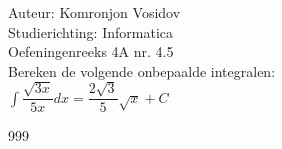 \documentclass[a4paper]{article}
\newcommand{\dint}{\displaystyle\int}
\begin{document}
	
	\noindent \large Auteur: Komronjon Vosidov \\
	\noindent \large Studierichting: Informatica\\
	\noindent \large Oefeningenreeks 4A nr. 4.5\\
	
	
	\medskip
	\normalsize
	Bereken de volgende onbepaalde integralen:\\
	
$ \dint \dfrac{\sqrt{3x}}{5x} dx = \dfrac{2 \sqrt{3}}{5} \sqrt{x} + C $
	
	
	
	
	
	
	
	\begin{thebibliography}{999}
	\end{thebibliography}		
\end{document}

